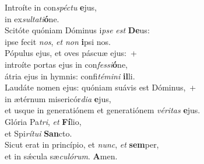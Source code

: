 \evenverse Introíte in con\textit{spé}\textit{ctu} \textbf{e}jus,~\*\\
\evenverse in ex\textit{sul}\textit{ta}\textit{ti}\textbf{ó}ne.\\
\oddverse Scitóte quóniam Dóminus i\textit{pse} \textit{est} \textbf{De}us:~\*\\
\oddverse ipse fecit \textit{nos}, \textit{et} \textit{non} \textbf{i}psi nos.\\
\evenverse Pópulus ejus, et oves páscuæ ejus:~+\\
\evenverse  introíte portas ejus in con\textit{fes}\textit{si}\textbf{ó}ne,~\*\\
\evenverse átria ejus in hymnis: confi\textit{té}\textit{mi}\textit{ni} \textbf{il}li.\\
\oddverse Laudáte nomen ejus: quóniam suávis est Dóminus,~+\\
\oddverse  in ætérnum misericór\textit{di}\textit{a} \textbf{e}jus,~\*\\
\oddverse et usque in generatiónem et generatiónem \textit{vé}\textit{ri}\textit{tas} \textbf{e}jus.\\
\evenverse Glória Pa\textit{tri}, \textit{et} \textbf{Fí}lio,~\*\\
\evenverse et Spi\textit{rí}\textit{tu}\textit{i} \textbf{San}cto.\\
\oddverse Sicut erat in princípio, et \textit{nunc}, \textit{et} \textbf{sem}per,~\*\\
\oddverse et in sǽcula sæ\textit{cu}\textit{ló}\textit{rum}. \textbf{A}men.\\
